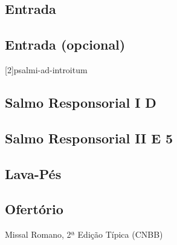 
\subsection{Entrada}\label{subsection:hebdomada-sancta/missa-in-cena-domini/psalmi-ad-introitum}

\AllowPageFlush

\subsection{Entrada (opcional)}\label{subsection:hebdomada-sancta/missa-in-cena-domini/psalmi-ad-introitum-ad-libitum}
[2]{psalmi-ad-introitum}

\AllowPageFlush

\subsection[Salmo Responsorial I]{Salmo Responsorial I \textmd{D \protect\GreStar}}\label{subsection:hebdomada-sancta/missa-in-cena-domini/psalmus-responsorius-1}

\AllowPageFlush

\subsection[Salmo Responsorial II]{Salmo Responsorial II \textmd{E 5}}\label{subsection:hebdomada-sancta/missa-in-cena-domini/psalmus-responsorius-2}

\AllowPageFlush

\subsection{Lava-Pés}\label{subsection:hebdomada-sancta/missa-in-cena-domini/psalmi-ad-lotionem-pedum}

\subsection{Ofertório}\label{subsection:hebdomada-sancta/missa-in-cena-domini/psalmi-ad-offertorium}
\begin{annotation}
  Missal Romano, 2ª Edição Típica (CNBB)
\end{annotation}

